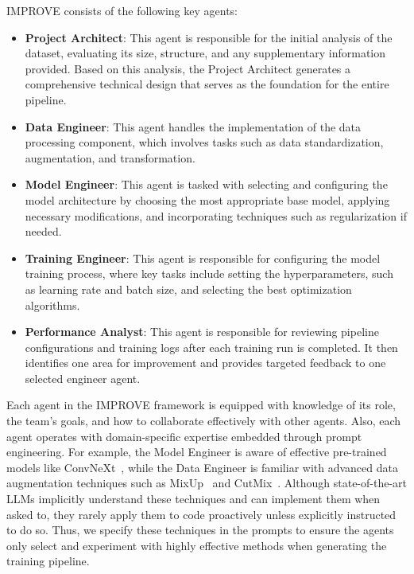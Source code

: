 IMPROVE consists of the following key agents:
\begin{itemize}
    \item \textbf{Project Architect}: This agent is responsible for the initial analysis of the dataset, evaluating its size, structure, and any supplementary information provided. Based on this analysis, the Project Architect generates a comprehensive technical design that serves as the foundation for the entire pipeline.
    \item \textbf{Data Engineer}: This agent handles the implementation of the data processing component, which involves tasks such as data standardization, augmentation, and transformation.
    \item \textbf{Model Engineer}: This agent is tasked with selecting and configuring the model architecture by choosing the most appropriate base model, applying necessary modifications, and incorporating techniques such as regularization if needed.
    \item \textbf{Training Engineer}: This agent is responsible for configuring the model training process, where key tasks include setting the hyperparameters, such as learning rate and batch size, and selecting the best optimization algorithms.
    \item \textbf{Performance Analyst}: This agent is responsible for reviewing pipeline configurations and training logs after each training run is completed. It then identifies one area for improvement and provides targeted feedback to one selected engineer agent.
\end{itemize}
Each agent in the IMPROVE framework is equipped with knowledge of its role, the team’s goals, and how to collaborate effectively with other agents. Also, each agent operates with domain-specific expertise embedded through prompt engineering. For example, the Model Engineer is aware of effective pre-trained models like ConvNeXt~\citep{liu2022convnext}, while the Data Engineer is familiar with advanced data augmentation techniques such as MixUp~\citep{zhang2018mixup} and CutMix~\citep{yun2019cutmix}. Although state-of-the-art LLMs implicitly understand these techniques and can implement them when asked to, they rarely apply them to code proactively unless explicitly instructed to do so. Thus, we specify these techniques in the prompts to ensure the agents only select and experiment with highly effective methods when generating the training pipeline.



